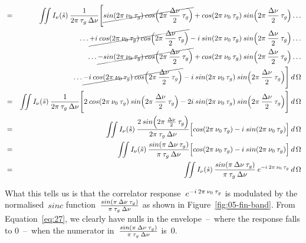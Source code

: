 \begin{eqnarray}
 \label{eq:27}
&=& \iint I_\nu (\hat{s}) \msp \frac{1}{2\pi \msp \tau _g \msp \Delta \nu} \Bigg [\cancel{sin (2\pi \msp \nu_ 0 \msp \tau _g) \msp cos\Big (2\pi \msp \frac{\Delta \nu }{2} \msp \tau _g\Big )} + cos(2\pi \msp \nu_ 0 \msp \tau _g) \msp sin\Big (2\pi \msp \frac{\Delta \nu }{2} \msp \tau _g\Big ) \dotso \nonumber \\
&& \dotso \cancel{+ i \msp cos (2\pi \msp \nu_ 0 \msp \tau _g) \msp cos\Big (2\pi \msp \frac{\Delta \nu }{2} \msp \tau _g\Big )} - i \msp sin(2\pi \msp \nu_ 0 \msp \tau _g) \msp sin\Big (2\pi \msp \frac{\Delta \nu }{2} \msp \tau _g\Big ) \dotso \nonumber \\
&& \dotso \cancel{- sin (2\pi \msp \nu_ 0 \msp \tau _g) \msp cos\Big (2\pi \msp \frac{\Delta \nu }{2} \msp \tau _g\Big )} + cos(2\pi \msp \nu_ 0 \msp \tau _g) \msp sin\Big (2\pi \msp \frac{\Delta \nu }{2} \msp \tau _g\Big ) \dotso \nonumber \\
&& \dotso \cancel{- i \msp cos (2\pi \msp \nu_ 0 \msp \tau _g) \msp cos\Big (2\pi \msp \frac{\Delta \nu }{2} \msp \tau _g\Big )} - i \msp sin(2\pi \msp \nu_ 0 \msp \tau _g) \msp sin\Big (2\pi \msp \frac{\Delta \nu }{2} \msp \tau _g\Big )\Bigg ] \msp d\,\Omega \nonumber \\
&=& \iint I_\nu (\hat{s}) \msp \frac{1}{2\pi \msp \tau _g \msp \Delta \nu} \Bigg [2 \msp cos(2\pi \msp \nu_ 0 \msp \tau _g) \msp sin\Big (2\pi \msp \frac{\Delta \nu }{2} \msp \tau _g\Big ) - 2 i \msp sin(2\pi \msp \nu_ 0 \msp \tau _g) \msp sin\Big (2\pi \msp \frac{\Delta \nu }{2} \msp \tau _g\Big ) \Bigg ] \msp d\,\Omega \nonumber \\
&=& \iint I_\nu (\hat{s}) \msp \frac{2 \msp sin\Big (2\pi \msp \frac{\Delta \nu }{2} \msp \tau _g\Big ) }{2\pi \msp \tau _g \msp \Delta \nu} \Big [cos(2\pi \msp \nu_ 0 \msp \tau _g) - i \msp sin(2\pi \msp \nu_ 0 \msp \tau _g) \Big ] \msp d\,\Omega \nonumber \\
&=& \iint I_\nu (\hat{s}) \msp \frac{sin (\pi \msp \Delta \nu \msp \tau _g)}{\pi \msp \tau _g \msp \Delta \nu} \Big [cos(2\pi \msp \nu_ 0 \msp \tau _g) - i \msp sin(2\pi \msp \nu_ 0 \msp \tau _g) \Big ] \msp d\,\Omega \nonumber \\
&=& \iint I_\nu (\hat{s}) \msp \frac{sin (\pi \msp \Delta \nu \msp \tau _g)}{\pi \msp \tau _g \msp \Delta \nu} \msp e^{-i \msp 2\pi \msp \nu _0 \msp \tau _g} \msp d\,\Omega
\end{eqnarray}

What this tells us is that the correlator response~$e^{-i \msp 2\pi \msp \nu _0 \msp \tau _g}$ is modulated by the normalised~$sinc$ function~$\frac{sin (\pi \msp \Delta \nu \msp \tau _g)}{\pi \msp \tau _g \msp \Delta \nu}$ as shown in Figure~\ref{fig:05-fin-band}. From Equation~\eqref{eq:27}, we clearly have nulls in the envelope~--~where the response falls to 0~--~when the numerator in~$\frac{sin (\pi \msp \Delta \nu \msp \tau _g)}{\pi \msp \tau _g \msp \Delta \nu}$ is~0.

